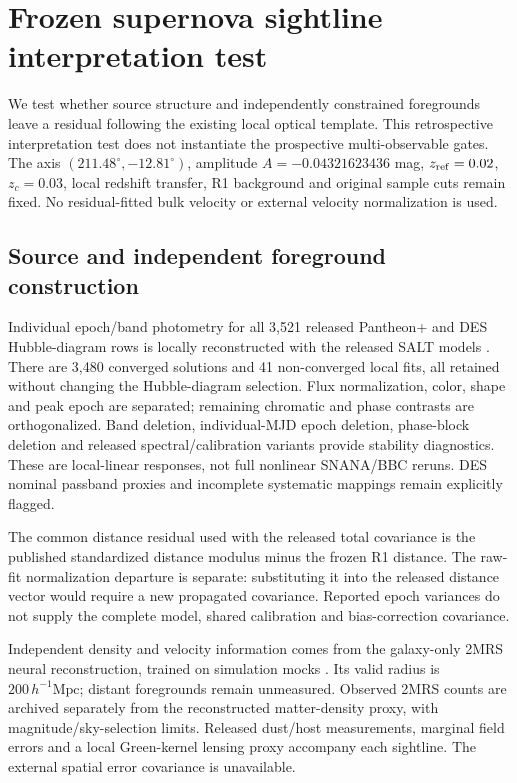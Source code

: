 \section{Frozen supernova sightline interpretation test}
\label{sec:sn-sightlines}
We test whether source structure and independently constrained foregrounds
leave a residual following the existing local optical template. This
retrospective interpretation test does not instantiate the prospective
multi-observable gates. The axis $(211.48^\circ,-12.81^\circ)$, amplitude
$A=-0.04321623436$ mag, $z_{\rm ref}=0.02$, $z_c=0.03$, local redshift
transfer, R1 background and original sample cuts remain fixed.
No residual-fitted bulk velocity or external velocity normalization is used.

\subsection{Source and independent foreground construction}
Individual epoch/band photometry for all 3,521 released Pantheon+ and DES
Hubble-diagram rows is locally reconstructed with the released SALT models
\citep{Scolnic2022,Sanchez2024DES,Abbott2024DES}.
There are 3,480 converged solutions and 41 non-converged local fits, all
retained without changing the Hubble-diagram selection. Flux normalization,
color, shape and peak epoch are separated; remaining chromatic and phase
contrasts are orthogonalized. Band deletion, individual-MJD epoch deletion,
phase-block deletion and released spectral/calibration variants provide
stability diagnostics. These are local-linear responses, not full nonlinear
SNANA/BBC reruns. DES nominal passband proxies and incomplete systematic
mappings remain explicitly flagged.

The common distance residual used with the released total covariance is
the published standardized distance modulus minus the frozen R1 distance.
The raw-fit normalization departure is separate: substituting it into
the released distance vector would require a new propagated covariance.
Reported epoch variances do not supply the complete model, shared
calibration and bias-correction covariance.

Independent density and velocity information comes from the galaxy-only
2MRS neural reconstruction, trained on simulation mocks
\citep{LilowEtAl2024Fields}. Its valid radius is
$200\,h^{-1}\mathrm{Mpc}$; distant foregrounds remain unmeasured.
Observed 2MRS counts \citep{Huchra2012} are archived separately from the
reconstructed matter-density proxy, with magnitude/sky-selection limits.
Released dust/host measurements, marginal field errors and a local
Green-kernel lensing proxy accompany each sightline. The external spatial
error covariance is unavailable.

